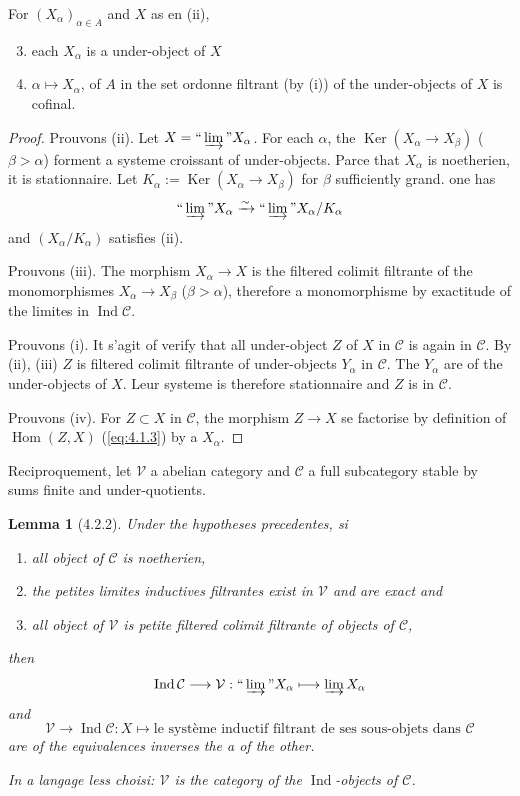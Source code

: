 \documentclass[12pt,a4paper]{article}
\theoremstyle{plain}
\newtheorem{lemma}[theorem]{Lemma}
\theoremstyle{definition}
\theoremstyle{remark}
\DeclareMathOperator{\Hom}{Hom}
\DeclareMathOperator{\Ker}{Ker}
\DeclareMathOperator{\Ind}{Ind}
\providecommand{\Hom}{\operatorname{Hom}}
\providecommand{\Ker}{\operatorname{Ker}}
\providecommand{\limind}{\varinjlim}
\begin{document}
For $(X_\alpha)_{\alpha \in A}$ and $X$ as en (ii),
\begin{enumerate}[label=(\roman*)]
\setcounter{enumi}{2}
\item each $X_\alpha$ is a under-object of $X$
\item $\alpha \mapsto X_\alpha$, of $A$ in the set ordonne filtrant (by (i)) of the
under-objects of $X$ is cofinal.
\end{enumerate}

\begin{proof}
Prouvons (ii). Let $X = \text{``}\limind\text{''} X_\alpha$. For each $\alpha$, the
$\Ker(X_\alpha \to X_\beta)$ ($\beta > \alpha$) forment a systeme croissant of
under-objects. Parce that $X_\alpha$ is noetherien, it is stationnaire. Let
$K_\alpha := \Ker(X_\alpha \to X_\beta)$ for $\beta$ sufficiently grand. one has
\[
\text{``}\limind\text{''} X_\alpha \xrightarrow{\sim}
\text{``}\limind\text{''} X_\alpha/K_\alpha
\]
and $(X_\alpha/K_\alpha)$ satisfies (ii).

Prouvons (iii). The morphism $X_\alpha \to X$ is the filtered colimit filtrante of the
monomorphismes $X_\alpha \to X_\beta$ ($\beta > \alpha$), therefore a monomorphisme by
exactitude of the limites in $\Ind\mathcal{C}$.

Prouvons (i). It s'agit of verify that all under-object $Z$ of $X$ in $\mathcal{C}$
is again in $\mathcal{C}$. By (ii), (iii) $Z$ is filtered colimit filtrante of
under-objects $Y_\alpha$ in $\mathcal{C}$. The $Y_\alpha$ are of the under-objects of $X$. Leur
systeme is therefore stationnaire and $Z$ is in $\mathcal{C}$.

Prouvons (iv). For $Z \subset X$ in $\mathcal{C}$, the morphism $Z \to X$ se
factorise by definition of $\Hom(Z,X)$ (\ref{eq:4.1.3}) by a $X_\alpha$.
\end{proof}

Reciproquement, let $\mathcal{V}$ a abelian category and $\mathcal{C}$ a
full subcategory stable by sums finite and under-quotients.

\begin{lemma}[4.2.2]\label{lem:4.2.2}
Under the hypotheses precedentes, si
\begin{enumerate}[label=(\roman*)]
\item all object of $\mathcal{C}$ is noetherien,
\item the petites limites inductives filtrantes exist in $\mathcal{V}$ and are exact
and
\item all object of $\mathcal{V}$ is petite filtered colimit filtrante of objects of
$\mathcal{C}$,
\end{enumerate}
then
\[
\Ind\mathcal{C} \longrightarrow \mathcal{V}:
\text{``}\limind\text{''} X_\alpha \longmapsto \limind X_\alpha
\]
and
\[
\mathcal{V} \longrightarrow \Ind\mathcal{C}: X \longmapsto \text{le syst\`eme
inductif filtrant de ses sous-objets dans } \mathcal{C}
\]
are of the equivalences inverses the a of the other.

In a langage less choisi: $\mathcal{V}$ is the category of the $\Ind$-objects of
$\mathcal{C}$.
\end{lemma}
\end{document}
